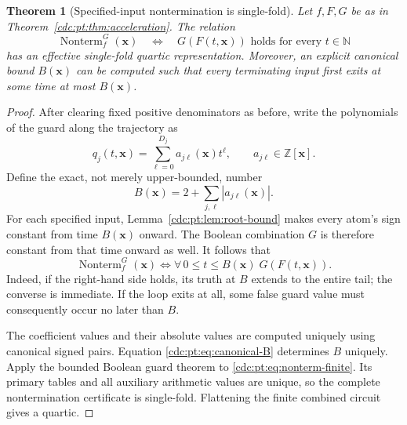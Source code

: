 \documentclass[11pt,a4paper]{article}
\newtheorem{theorem}{Theorem}[section]
\theoremstyle{definition}
\theoremstyle{remark}
\newcommand{\N}{\mathbb N}
\newcommand{\Z}{\mathbb Z}
\newcommand{\Nonterm}{\operatorname{Nonterm}}
\begin{document}
\begin{theorem}[Specified-input nontermination is single-fold]
\label{cdc:pt:thm:nontermination}
Let $f,F,G$ be as in Theorem~\ref{cdc:pt:thm:acceleration}. The relation
\[
 \Nonterm_f^G(\boldsymbol x)
 \quad\Longleftrightarrow\quad
 G(F(t,\boldsymbol x))\text{ holds for every }t\in\N
\]
has an effective single-fold quartic representation. Moreover, an explicit
canonical bound $B(\boldsymbol x)$ can be computed such that every
terminating input first exits at some time at most $B(\boldsymbol x)$.
\end{theorem}
\begin{proof}
After clearing fixed positive denominators as before, write the
polynomials of the guard along the trajectory as
\[
 q_j(t,\boldsymbol x)=\sum_{\ell=0}^{D_j}
 a_{j\ell}(\boldsymbol x)t^\ell,
 \qquad a_{j\ell}\in\Z[\boldsymbol x].
\]
Define the exact, not merely upper-bounded, number
\begin{equation}
 B(\boldsymbol x)=2+\sum_{j,\ell}|a_{j\ell}(\boldsymbol x)|.
 \label{cdc:pt:eq:canonical-B}
\end{equation}
For each specified input, Lemma~\ref{cdc:pt:lem:root-bound} makes every atom's
sign constant from time $B(\boldsymbol x)$ onward. The Boolean combination
$G$ is therefore constant from that time onward as well. It follows that
\begin{equation}
 \Nonterm_f^G(\boldsymbol x)
 \iff \forall\,0\leq t\leq B(\boldsymbol x)\;
 G(F(t,\boldsymbol x)).
 \label{cdc:pt:eq:nonterm-finite}
\end{equation}
Indeed, if the right-hand side holds, its truth at $B$ extends to the
entire tail; the converse is immediate. If the loop exits at all, some
false guard value must consequently occur no later than $B$.

The coefficient values and their absolute values are computed uniquely
using canonical signed pairs. Equation \eqref{cdc:pt:eq:canonical-B} determines
$B$ uniquely. Apply the bounded Boolean guard theorem to
\eqref{cdc:pt:eq:nonterm-finite}. Its primary tables and all auxiliary arithmetic
values are unique, so the complete nontermination certificate is
single-fold. Flattening the finite combined circuit gives a quartic.
\end{proof}
\end{document}
